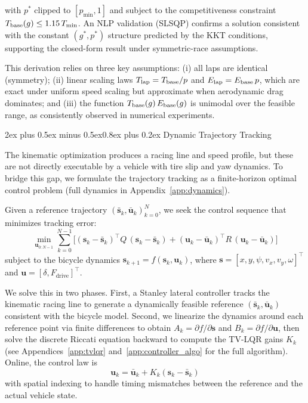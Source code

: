 \documentclass[conf]{new-aiaa}
\makeatletter
\renewcommand\section{\@startsection{section}{1}{\z@}%
  {2ex plus 0.5ex minus 0.5ex}{0.8ex plus 0.2ex}%
  {\normalfont\large\bfseries\centering}}
\makeatother
\begin{document}
with $p^*$ clipped to $[p_{\min}, 1]$ and subject to the competitiveness constraint
$T_{\rm base}(g) \leq 1.15\,T_{\min}$. An NLP validation (SLSQP) confirms a solution consistent
with the constant $(g^*, p^*)$ structure predicted by the KKT conditions, supporting the closed-form
result under symmetric-race assumptions.

This derivation relies on three key assumptions: (i) all laps are identical (symmetry);
(ii) linear scaling laws $T_{\rm lap} = T_{\rm base}/p$ and $E_{\rm lap} = E_{\rm base}\,p$,
which are exact under uniform speed scaling but approximate when aerodynamic drag dominates; and
(iii) the function $T_{\rm base}(g)\,E_{\rm base}(g)$ is unimodal over the feasible range, as
consistently observed in numerical experiments.

\section{Dynamic Trajectory Tracking}

The kinematic optimization produces a racing line and speed profile, but these are not directly
executable by a vehicle with tire slip and yaw dynamics. To bridge this gap, we formulate the
trajectory tracking as a finite-horizon optimal control problem (full dynamics in
Appendix~\ref{app:dynamics}).

Given a reference trajectory $(\bar{\mathbf{s}}_k, \bar{\mathbf{u}}_k)_{k=0}^{N}$, we seek the
control sequence that minimizes tracking error:
\begin{equation}\label{eq:lqr_cost}
  \min_{\mathbf{u}_{0:N-1}} \sum_{k=0}^{N-1}
    \bigl[(\mathbf{s}_k - \bar{\mathbf{s}}_k)^\top Q\,(\mathbf{s}_k - \bar{\mathbf{s}}_k)
         + (\mathbf{u}_k - \bar{\mathbf{u}}_k)^\top R\,(\mathbf{u}_k - \bar{\mathbf{u}}_k)\bigr]
\end{equation}
subject to the bicycle dynamics $\mathbf{s}_{k+1} = f(\mathbf{s}_k, \mathbf{u}_k)$, where
$\mathbf{s} = [x, y, \psi, v_x, v_y, \omega]^\top$ and $\mathbf{u} = [\delta, F_{\text{drive}}]^\top$.

We solve this in two phases. First, a Stanley lateral controller tracks the kinematic racing line
to generate a dynamically feasible reference $(\bar{\mathbf{s}}_k, \bar{\mathbf{u}}_k)$
consistent with the bicycle model. Second, we linearize the dynamics around each reference point
via finite differences to obtain $A_k = \partial f / \partial \mathbf{s}$ and
$B_k = \partial f / \partial \mathbf{u}$, then solve the discrete Riccati equation backward to
compute the TV-LQR gains $K_k$ (see Appendices~\ref{app:tvlqr} and~\ref{app:controller_algo} for the full algorithm). Online, the control law is
\begin{equation}
  \mathbf{u}_k = \bar{\mathbf{u}}_k + K_k (\mathbf{s}_k - \bar{\mathbf{s}}_k)
\end{equation}
with spatial indexing to handle timing mismatches between the reference and the actual vehicle
state.
\end{document}

